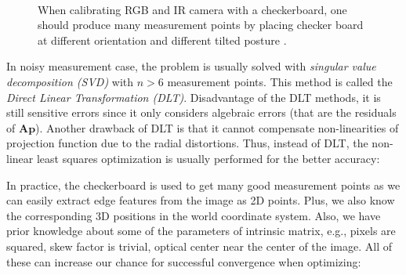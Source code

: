 \documentclass[a4paper]{report}
\numberwithin{figure}{section}
\begin{document}
\begin{figure}[H]
\centering
{} \\
\caption[Checkboard Calibration for RGB and IR Camera]{When calibrating RGB 
and IR camera with a checkerboard, one should produce many measurement points 
by placing checker board at different orientation and different tilted 
posture \parencite{Karan2015}.}
\end{figure}\label{fig:}


In noisy measurement case, the problem is usually solved with \textit{singular 
value decomposition (SVD)} with $n > 6$ measurement points.  This method is 
called the \textit{Direct Linear Transformation (DLT)}.  Disadvantage of the 
DLT methods, it is still sensitive errors since it only considers algebraic 
errors (that are the residuals of $\mathbf{Ap}$).  Another drawback of DLT is 
that it cannot compensate non-linearities of projection function due to the 
radial distortions.  Thus, instead of DLT, the non-linear least squares 
optimization is usually performed for the better accuracy:

In practice, the checkerboard is used to get many good measurement points as 
we can easily extract edge features from the image as 2D points.  Plus, we 
also know the corresponding 3D positions in the world coordinate system.
Also, we have prior knowledge about some of the parameters of intrinsic 
matrix, e.g., pixels are squared, skew factor is trivial, optical center near 
the center of the image. All of these can increase our chance for successful 
convergence when optimizing:
\end{document}
